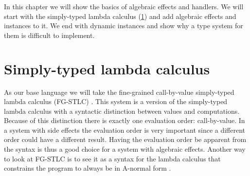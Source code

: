 {
\newcommand\ty[0]{\tau}
\newcommand\tunit[0]{()}
\newcommand\tarr[2]{#1 \rightarrow #2}
\newcommand\thandler[2]{#1 \Rightarrow #2}
\newcommand\tforall[3]{\forall(#1:#2) . #3}

\newcommand\cty[0]{\underline{\ty}}
\newcommand\aty[2]{#1 \; ! \; #2}
\newcommand\texists[3]{\exists(#1:#2) . #3}
\newcommand\texistss[2]{\exists \overrightarrow{#1} . #2}

\newcommand\val[0]{\nu}
\newcommand\vunit[0]{()}
\newcommand\vinst[1]{\mathsf{inst}(#1)}
\newcommand\vabst[3]{\Lambda(#1:#2) . #3}
\newcommand\vabs[2]{\lambda #1 . #2}
\newcommand\vappt[2]{#1 \; [ #2 ]}
\newcommand\vhandler[1]{\textit{handler} \; \{#1\}}
\newcommand\vhandleri[2]{\textit{handler} ( #1 ) \; \{#2\}}
\newcommand\vhandlerc[0]{\vhandler{
	\textit{return} \; x \rightarrow \comp,
	\op_1(x ; k) \rightarrow \comp,
	...,
	\op_n(x ; k) \rightarrow \comp
}}
\newcommand\vhandlerci[1]{\vhandleri{#1}{
	\textit{return} \; x \rightarrow \comp,
	\op_1(x ; k) \rightarrow \comp,
	...,
	\op_n(x ; k) \rightarrow \comp
}}

\newcommand\comp[0]{c}
\newcommand\creturn[1]{\mathsf{return} \; #1}
\newcommand\capp[2]{#1 \; #2}
\newcommand\cdo[3]{#1 \leftarrow #2 ; #3}
\newcommand\cop[4]{#1(#2 ; #3 . #4)}
\newcommand\copi[5]{#1 \# #2(#3 ; #4 . #5)}
\newcommand\chandle[2]{\textit{with} \; #1 \; \textit{handle} \; #2}
\newcommand\cnew[1]{\textit{new} \; #1}
\newcommand\cunpack[4]{(#1, #2) \leftarrow #3 ; #4}

In this chapter we will show the basics of algebraic effects and handlers. We will start with the simply-typed lambda calculus (\cref{section:stlc}) and add algebraic effects and instances to it. We end with dynamic instances and show why a type system for them is difficult to implement.

\section{Simply-typed lambda calculus} \label{section:stlc}

As our base language we will take the fine-grained call-by-value simply-typed lambda calculus (FG-STLC) \cite{fg-stlc}.
This system is a version of the simply-typed lambda calculus with a syntactic distinction between values and computations.
Because of this distinction there is exactly one evaluation order: call-by-value.
In a system with side effects the evaluation order is very important since a different order could have a different result.
Having the evaluation order be apparent from the syntax is thus a good choice for a system with algebraic effects.
Another way to look at FG-STLC is to see it as a syntax for the lambda calculus that constrains the program to always be in A-normal form \cite{anormalform}.

}
